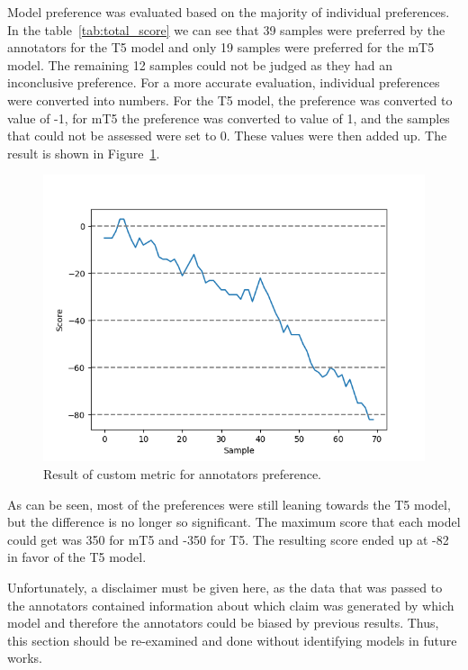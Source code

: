 Model preference was evaluated based on the majority of individual preferences. In the table~\ref{tab:total_score} we can see that 39 samples were preferred by the annotators for the T5 model and only 19 samples were preferred for the mT5 model. The remaining 12 samples could not be judged as they had an inconclusive preference. For a more accurate evaluation, individual preferences were converted into numbers. For the T5 model, the preference was converted to value of -1, for mT5 the preference was converted to value of 1, and the samples that could not be assessed were set to 0. These values were then added up. The result is shown in Figure~\ref{fig:model_results}.

\begin{figure}[H]
    \centering
    \includegraphics[scale=0.6]{figures/model_results.png}
    \caption{Result of custom metric for annotators preference.}
    \label{fig:model_results}
\end{figure}

As can be seen, most of the preferences were still leaning towards the T5 model, but the difference is no longer so significant. The maximum score that each model could get was 350 for mT5 and -350 for T5. The resulting score ended up at -82 in favor of the T5 model. 

Unfortunately, a disclaimer must be given here, as the data that was passed to the annotators contained information about which claim was generated by which model and therefore the annotators could be biased by previous results. Thus, this section should be re-examined and done without identifying models in future works.

